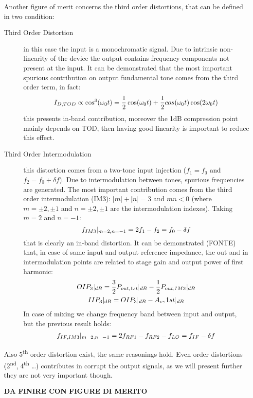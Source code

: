 Another figure of merit concerns the third order distortions, that can be defined in two condition:
\begin{description}
	\item [Third Order Distortion] in this case the input is a monochromatic signal. Due to intrinsic non-linearity of the device the output contains frequency components not present at the input. It can be demonstrated that the most important spurious contribution on output fundamental tone comes from the third order term, in fact:
	\begin{equation}
	I_{D,TOD} \propto \cos^3(\omega_0 t) = \frac{1}{2}\cos(\omega_0 t)+\frac{1}{2}cos(\omega_0 t)\cos(2\omega_0 t) \notag
	\end{equation} 
	this presents in-band contribution, moreover the 1dB compression point mainly depends on TOD, then having good linearity is important to reduce this effect.
	
	\item [Third Order Intermodulation] this distortion comes from a two-tone input injection ($f_1 = f_0$ and $f_2=f_0+\delta f$). Due to intermodulation between tones, spurious frequencies are generated. The most important contribution comes from the third order intermodulation (IM3): $|m|+|n|=3$ and $mn<0$ (where $m=\pm2,\pm1$ and $n=\pm2,\pm1$ are the intermodulation indexes). Taking $m=2$ and $n=-1$:
	\begin{equation}
		f_{IM3}|_{m=2,n=-1} = 2f_1-f_2 = f_0 - \delta f \notag
	\end{equation}
	that is clearly an in-band distortion.
	It can be demonstrated (FONTE) that, in case of same input and output reference impedance, the out and in intermodulation points are related to stage gain and output power of first harmonic:
	\begin{gather}
	OIP_3|_{dB} = \frac{3}{2}P_{out,1st}|_{dB}-\frac{1}{2}P_{out,IM3}|_{dB} \notag \\
	IIP_3|_{dB} = OIP_3|_{dB}-A_v,1st|_{dB} \notag
	\end{gather} 
	In case of mixing we change frequency band between input and output, but the previous result holds:
	\begin{gather}
			f_{IF,IM3}|_{m=2,n=-1} = 2f_{RF1} - f_{RF2} -f_{LO}= f_{IF} - \delta f \notag
	\end{gather}
\end{description}

Also 5\textsuperscript{th} order distortion exist, the same reasonings hold. Even order distortions (2\textsuperscript{nd}, 4\textsuperscript{th} \dots) contributes in corrupt the output signals, as we will present further they are not very important though.

\textbf{DA FINIRE CON FIGURE DI MERITO}
